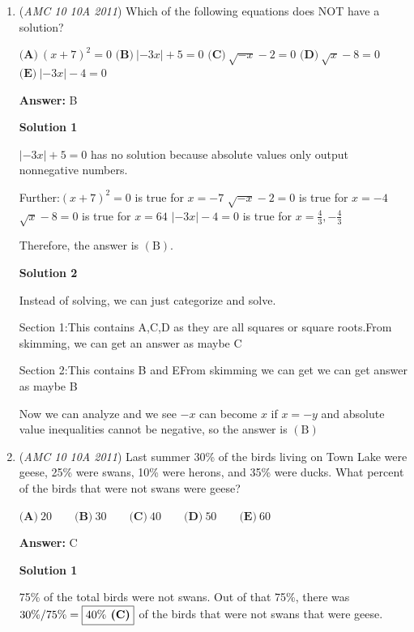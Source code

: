 \begin{enumerate}
 


 


	\item (\textit{AMC 10 10A 2011}) Which of the following equations does NOT have a solution?


 $\textbf{(A)}\:(x+7)^2=0$
$\textbf{(B)}\:\left|-3x\right|+5=0$
$\textbf{(C)}\:\sqrt{-x}-2=0$
$\textbf{(D)}\:\sqrt{x}-8=0$
$\textbf{(E)}\:\left|-3x\right|-4=0$

 \textbf{Answer: }B



\textbf{Solution 1}

$|-3x|+5=0$ has no solution because absolute values only output nonnegative numbers.

 Further:$(x+7)^2 = 0$ is true for $x = -7$
$\sqrt{-x}-2=0$ is true for $x = -4$
$\sqrt{x}-8=0$ is true for $x = 64$
$|-3x|-4=0$ is true for $x = \frac{4}{3}, -\frac{4}{3}$

 Therefore, the answer is $\boxed{\mathrm{(B)}}$.

 



\textbf{Solution 2}

Instead of solving, we can just categorize and solve.

 Section 1:This contains A,C,D as they are all squares or square roots.From skimming, we can get an answer as maybe C

 Section 2:This contains B and EFrom skimming we can get we can get answer as maybe B

 Now we can analyze and we see $-x$ can become $x$ if $x=-y$ and absolute value inequalities cannot be negative, so the answer is $\boxed{\mathrm{(B)}}$



	\item (\textit{AMC 10 10A 2011}) Last summer 30\% of the birds living on Town Lake were geese, 25\% were swans, 10\% were herons, and 35\% were ducks. What percent of the birds that were not swans were geese?


 $\textbf{(A)}\ 20 \qquad\textbf{(B)}\ 30 \qquad\textbf{(C)}\ 40\qquad\textbf{(D)}\ 50\qquad\textbf{(E)}\ 60$

 \textbf{Answer: }C



\textbf{Solution 1}

75\% of the total birds were not swans. Out of that 75\%, there was $30\% / 75\% = \boxed{40\%\text{\textbf{ (C)}}}$ of the birds that were not swans that were geese.


\end{enumerate}
